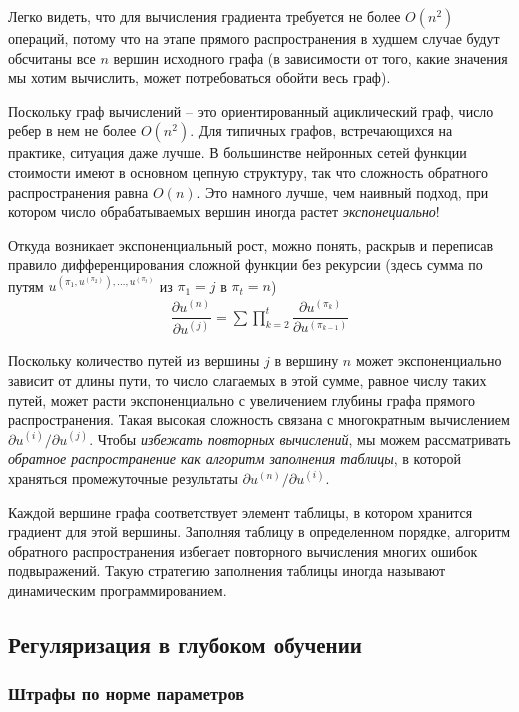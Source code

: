 \documentclass[%
	11pt,
	a4paper,
	utf8,
]{article}
\begin{document}
Легко видеть, что для вычисления градиента требуется не более $ O(n^2) $ операций, потому что на этапе прямого распространения в худшем случае будут обсчитаны все $ n $ вершин исходного графа (в зависимости от того, какие значения мы хотим вычислить, может потребоваться обойти весь граф). 

{\color{blue}Поскольку граф вычислений -- это ориентированный ациклический граф, число ребер в нем не более $ O(n^2) $.}  Для типичных графов, встречающихся на практике, ситуация даже лучше. В большинстве нейронных сетей функции стоимости имеют в основном цепную структуру, так что сложность обратного распространения равна $ O(n) $. Это намного лучше, чем наивный подход, при котором число обрабатываемых вершин иногда растет \emph{экспонециально}!

Откуда возникает экспоненциальный рост, можно понять, раскрыв и переписав правило дифференцирования сложной функции без рекурсии (здесь сумма по путям $ u^{(\pi_1, u^{(\pi_2)}), \ldots, u^{(\pi_t)}} $ из $ \pi_1 = j $ в $ \pi_t = n $)
\begin{align*}
	\dfrac{ \partial u^{(n)} }{ \partial u^{(j)} } = \sum \prod_{k=2}^{t}  \dfrac{ \partial u^{(\pi_k)} }{ \partial u^{(\pi_{k - 1})} }
\end{align*}

Поскольку количество путей из вершины $ j $ в вершину $ n $ может экспоненциально зависит от длины пути, то число слагаемых в этой сумме, равное числу таких путей, может расти экспоненциально с увеличением глубины графа прямого распространения. Такая высокая сложность связана с многократным вычислением $ \partial u^{(i)} / \partial u^{(j)} $. Чтобы \emph{избежать повторных вычислений}, мы можем рассматривать \emph{обратное распространение как алгоритм заполнения таблицы}, в которой храняться промежуточные результаты $ \partial u^{(n)} / \partial u^{(i)} $.

Каждой вершине графа соответствует элемент таблицы, в котором хранится градиент для этой вершины. Заполняя таблицу в определенном порядке, алгоритм обратного распространения избегает повторного вычисления многих ошибок подвыражений. Такую стратегию заполнения таблицы иногда называют динамическим программированием.

\subsection{Регуляризация в глубоком обучении}

\subsubsection{Штрафы по норме параметров}
\end{document}
